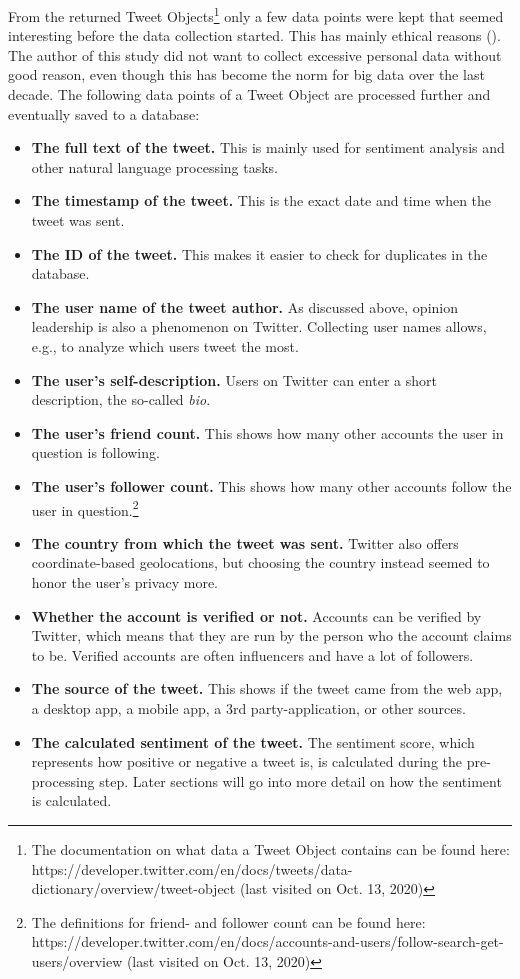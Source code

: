 From the returned Tweet Objects\footnote{The documentation on what data a Tweet Object contains can be found here: https://developer.twitter.com/en/docs/tweets/data-dictionary/overview/tweet-object (last visited on Oct. 13, 2020)} only a few data points were kept that seemed interesting before the data collection started. This has mainly ethical reasons (\cite{richards2014big}). The author of this study did not want to collect excessive personal data without good reason, even though this has become the norm for big data over the last decade. The following data points of a Tweet Object are processed further and eventually saved to a database:

\begin{itemize}
\item \textbf{The full text of the tweet.} This is mainly used for sentiment analysis and other natural language processing tasks.
\item \textbf{The timestamp of the tweet.} This is the exact date and time when the tweet was sent.
\item \textbf{The ID of the tweet.} This makes it easier to check for duplicates in the database. 
\item \textbf{The user name of the tweet author.} As discussed above, opinion leadership is also a phenomenon on Twitter. Collecting user names allows, e.g., to analyze which users tweet the most.
\item \textbf{The user's self-description.} Users on Twitter can enter a short description, the so-called \emph{bio}.
\item \textbf{The user's friend count.} This shows how many other accounts the user in question is following.
\item \textbf{The user's follower count.} This shows how many other accounts follow the user in question.\footnote{The definitions for friend- and follower count can be found here: https://developer.twitter.com/en/docs/accounts-and-users/follow-search-get-users/overview (last visited on Oct. 13, 2020)}
\item \textbf{The country from which the tweet was sent.} Twitter also offers coordinate-based geolocations, but choosing the country instead seemed to honor the user's privacy more.
\item \textbf{Whether the account is verified or not.} Accounts can be verified by Twitter, which means that they are run by the person who the account claims to be. Verified accounts are often influencers and have a lot of followers.
\item \textbf{The source of the tweet.} This shows if the tweet came from the web app, a desktop app, a mobile app, a 3rd party-application, or other sources.
\item \textbf{The calculated sentiment of the tweet.} The sentiment score, which represents how positive or negative a tweet is, is calculated during the pre-processing step. Later sections will go into more detail on how the sentiment is calculated.
\end{itemize}

